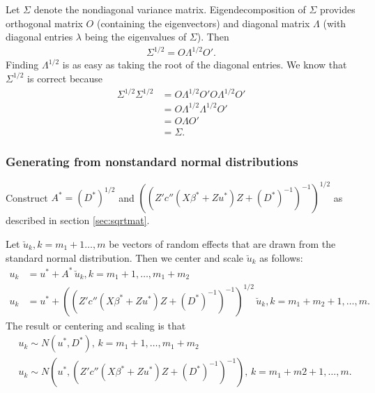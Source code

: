 \documentclass{article}
\begin{document}
Let $\Sigma$ denote the nondiagonal variance matrix. Eigendecomposition of $\Sigma$ provides orthogonal matrix $O$ (containing the eigenvectors) and diagonal matrix $\Lambda$ (with diagonal entries $\lambda$ being the eigenvalues of $\Sigma$).  Then
\begin{align}
\Sigma^{1/2}= O \Lambda^{1/2} O'.
\end{align}
Finding $\Lambda^{1/2}$ is as easy as taking the root of the diagonal entries.  We know that $\Sigma^{1/2}$ is correct because
\begin{align}
\Sigma^{1/2} \Sigma^{1/2} &= O \Lambda^{1/2} O'O \Lambda^{1/2} O'\\ \nonumber
&= O \Lambda^{1/2}\Lambda^{1/2} O'\\\nonumber
&=O \Lambda O' \\\nonumber
&= \Sigma.
\end{align}

\subsubsection{Generating from nonstandard normal distributions}\label{sec:gennonstand}
 Construct $A^*=(D^*)^{1/2}$ and $((Z'  c''(X \beta^*+Zu^*) Z +(D^*)^{-1}   )^{-1})^{1/2} $ as described in section \ref{sec:sqrtmat}. 

Let $\breve{u}_k,k=m_1+1\ldots,m$ be vectors of random effects that are drawn from the standard normal distribution. Then we center and scale $\breve{u}_k$ as follows:
\begin{align}
u_k&= u^*+A^* \, \breve{u}_k, k=m_1+1,\ldots,m_1+m_2\\
u_k&= u^*+ ((Z'  c''(X \beta^*+Zu^*) Z +(D^*)^{-1}   )^{-1})^{1/2} \,  \breve{u}_k, k=m_1+m_2+1,\ldots,m.
\end{align}
 The result or centering and scaling is that
\begin{align}
 &u_k \sim N(u^*,D^*), \, k=m_1+1,\ldots,m_1+m_2\\
& u_k \sim N(u^*,(Z'  c''(X \beta^*+Zu^*) Z +(D^*)^{-1}   )^{-1}), \, k=m_1+m2+1,\ldots,m .
\end{align}
\end{document}
